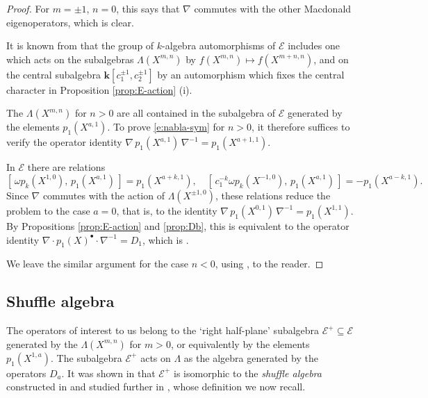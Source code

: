 \documentclass[12pt]{amsart}
\theoremstyle{definition}
\theoremstyle{remark}
\newcommand{\kk}{{\mathbf k}}
\newcommand{\Ecal}{{\mathcal E}}
\begin{document}
\begin{proof}
For $m=\pm 1$, $n=0$, this says that $\nabla $ commutes with the other
Macdonald eigenoperators, which is clear.

It is known from \cite{BurbSchi12} that the group of $k$-algebra
automorphisms of $\Ecal $ includes one which acts on the subalgebras
$\Lambda (X^{m,n})$ by $f(X^{m,n})\mapsto f(X^{m+n,n})$, and on the
central subalgebra $\kk [c_{1}^{\pm 1},c_{2}^{\pm 1}]$ by an
automorphism which fixes the central character in Proposition
\ref{prop:E-action} (i).

The $\Lambda (X^{m,n})$ for $n>0$ are all contained in the subalgebra
of $\Ecal $ generated by the elements $p_{1}(X^{a,1})$.  To prove
\eqref{e:nabla-sym} for $n>0$, it therefore suffices to verify the
operator identity $\nabla \, p_{1}(X^{a,1})\, \nabla^{-1} =
p_{1}(X^{a+1,1})$.

In $\Ecal $ there are relations
\begin{equation}\label{e:E-commmutators-II}
[\, \omega p_{k}(X^{1,0}),\, p_{1}(X^{a,1})\, ] =
p_{1}(X^{a+k,1}),\quad [\, c_{1}^{-k}\omega p_{k}(X^{-1,0}),\,
p_{1}(X^{a,1})\, ] = -p_{1}(X^{a-k,1}).
\end{equation}
Since $\nabla $ commutes with the action of $\Lambda (X^{\pm 1,0})$,
these relations reduce the problem to the case $a=0$, that is, to the
identity $\nabla \, p_{1}(X^{0,1})\, \nabla ^{-1} = p_{1}(X^{1,1})$.
By Propositions \ref{prop:E-action} and \ref{prop:Db}, this is
equivalent to the operator identity $\nabla\cdot p_{1}(X)^{\bullet
}\cdot \nabla ^{-1} = D_{1}$, which is \cite[I.12 (iii)]{BeGaHaTe99}.

We leave the similar argument for the case $n<0$, using
\cite[I.12 (iv)]{BeGaHaTe99}, to the reader.
\end{proof}


\subsection{Shuffle algebra}
\label{ss:shuffle-algebra}

The operators of interest to us belong to the `right half-plane'
subalgebra $\Ecal ^{+}\subseteq \Ecal $ generated by the $\Lambda
(X^{m,n})$ for $m>0$, or equivalently by the elements
$p_{1}(X^{1,a})$.  The subalgebra $\Ecal ^{+}$ acts on $\Lambda $ as
the algebra generated by the operators $D_{a}$.  It was shown in
\cite{SchiVass13} that $\Ecal ^{+}$ is isomorphic to the {\em shuffle
algebra} constructed in \cite{FeigTsym11} and studied further in
\cite{Negut14}, whose definition we now recall.
\end{document}
